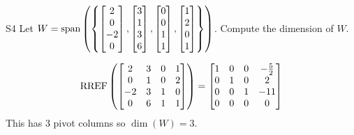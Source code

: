 \begin{problem}{S4}
Let \(W=\operatorname{span}\left(\left\{\begin{bmatrix} 2 \\ 0 \\ -2 \\ 0 \end{bmatrix}, \begin{bmatrix} 3 \\ 1 \\ 3 \\ 6 \end{bmatrix}, \begin{bmatrix} 0 \\ 0 \\ 1 \\ 1 \end{bmatrix}, \begin{bmatrix}1 \\ 2 \\ 0 \\ 1 \end{bmatrix}\right\}\right)\). Compute the dimension of \(W\).
\end{problem}
\begin{solution}
\[\operatorname{RREF}\left( \begin{bmatrix} 2 & 3 & 0 & 1 \\ 0 & 1 & 0 & 2 \\ -2 & 3 & 1 & 0 \\ 0 & 6 & 1 & 1\end{bmatrix} \right) = \begin{bmatrix}1 & 0 & 0 & -\frac{5}{2} \\ 0 & 1 & 0 & 2 \\ 0 & 0 & 1 & -11\\ 0 & 0 & 0 & 0  \end{bmatrix}\]
This has 3 pivot columns so  \(\dim(W) =3\).
\end{solution}


